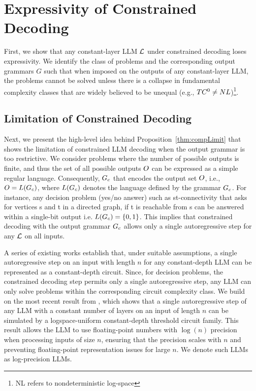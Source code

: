 \vspace{-5pt}
\section{Expressivity of Constrained Decoding}
\label{sec:expressivityTheory}
First, we show that any constant-layer LLM $\mathcal{L}{}$ under constrained decoding loses expressivity. 
We identify the class of problems and the corresponding output grammars $G$ such that when imposed on the outputs of any constant-layer LLM, the problems cannot be solved unless there is a collapse in fundamental complexity classes that are widely believed to be unequal (e.g., $TC^{0} \neq NL$)\footnote{NL refers to nondeterministic log-space}. 
\vspace{-3pt}
\subsection{Limitation of Constrained Decoding}
Next, we present the high-level idea behind Proposition~\ref{thm:compLimit} that shows the limitation of constrained LLM decoding when the output grammar is too restrictive. 
We consider problems where the number of possible outputs is finite, and thus the set of all possible outputs $O$ can be expressed as a simple regular language.
Consequently, $G_c$ that encodes the output set $O$, i.e., $O = L(G_c)$, where $L(G_c)$ denotes the language defined by the grammar $G_c$. 
For instance, any decision problem (yes/no answer) such as st-connectivity that asks for vertices s and t in a directed graph, if t is reachable from s can be answered within a single-bit output i.e. $L(G_c) = \{0, 1\}$. 
This implies that constrained decoding with the output grammar $G_c$ allows only a single autoregressive step for any $\mathcal{L}{}$ on all inputs.

A series of existing works \cite{circuit1, cicuit2, circuit3, tc0} establish that, under suitable assumptions, a single autoregressive step on an input with length $n$ for any constant-depth LLM can be represented as a constant-depth circuit. 
Since, for decision problems, the constrained decoding step permits only a single autoregressive step, any LLM can only solve problems within the corresponding circuit complexity class. 
We build on the most recent result from \cite{tc0}, which shows that a single autoregressive step of any LLM with a constant number of layers on an input of length $ n $ can be simulated by a logspace-uniform constant-depth threshold circuit family. 
This result allows the LLM to use floating-point numbers with $\log(n)$ precision when processing inputs of size $ n $, ensuring that the precision scales with $ n $ and preventing floating-point representation issues for large $n$. 
We denote such LLMs as log-precision LLMs.

